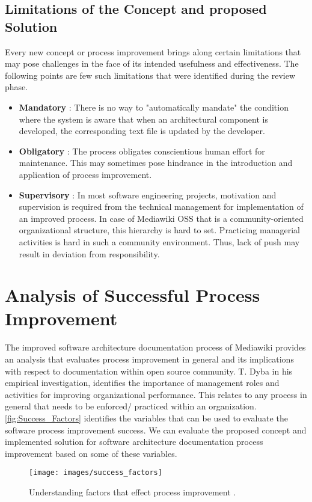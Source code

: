 \subsection{Limitations of the Concept and proposed Solution}
Every new concept or process improvement brings along certain limitations that may pose challenges in the face of its intended usefulness and effectiveness. The following points are few such limitations that were identified during the review phase.
\begin{itemize}
\item \textbf{Mandatory} : There is no way to "automatically mandate" the condition where the system is aware that when an architectural component is developed, the corresponding text file is updated by the developer.
\item \textbf{Obligatory} : The process obligates conscientious human effort for maintenance. This may sometimes pose hindrance in the introduction and application of process improvement.
\item \textbf{Supervisory} : In most software engineering projects, motivation and supervision is required from the technical management for implementation of an improved process. In case of Mediawiki OSS that is a community-oriented organizational structure, this hierarchy is hard to set. Practicing managerial activities is hard in such a community environment. Thus, lack of push may result in deviation from responsibility.
\end{itemize}


\section{Analysis of Successful Process Improvement}
The improved software architecture documentation process of Mediawiki provides an analysis that evaluates process improvement in general and its implications with respect to documentation within open source community. T. Dyba \cite{Dyba2005} in his empirical investigation, identifies the importance of management roles and activities for improving organizational performance. This relates to any process in general that needs to be enforced/ practiced within an organization.
\newline
\autoref{fig:Success_Factors} identifies the variables that can be used to evaluate the software process improvement success. We can evaluate the proposed concept and implemented solution for software architecture documentation process improvement based on some of these variables.
\begin{figure}[H]
  \centering
  \texttt{[image: images/success\_factors]}
  \caption[Understanding factors that effect process improvement]{Understanding factors that effect process improvement \cite{Dyba2005}.}\label{fig:Success_Factors}
\end{figure}

